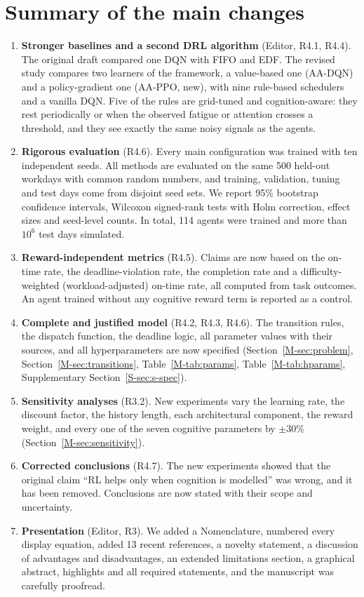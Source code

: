 \documentclass[11pt]{article}
\newcommand{\Sec}[1]{Section~\ref{M-#1}}
\newcommand{\Tab}[1]{Table~\ref{M-#1}}
\begin{document}
\section*{Summary of the main changes}
\begin{enumerate}[label=\arabic*.]
\item \textbf{Stronger baselines and a second DRL algorithm} (Editor, R4.1, R4.4). The original draft compared one DQN with FIFO and EDF. The revised study compares two learners of the framework, a value-based one (AA-DQN) and a policy-gradient one (AA-PPO, new), with nine rule-based schedulers and a vanilla DQN. Five of the rules are grid-tuned and cognition-aware: they rest periodically or when the observed fatigue or attention crosses a threshold, and they see exactly the same noisy signals as the agents.
\item \textbf{Rigorous evaluation} (R4.6). Every main configuration was trained with ten independent seeds. All methods are evaluated on the same 500 held-out workdays with common random numbers, and training, validation, tuning and test days come from disjoint seed sets. We report 95\% bootstrap confidence intervals, Wilcoxon signed-rank tests with Holm correction, effect sizes and seed-level counts. In total, 114 agents were trained and more than $10^6$ test days simulated.
\item \textbf{Reward-independent metrics} (R4.5). Claims are now based on the on-time rate, the deadline-violation rate, the completion rate and a difficulty-weighted (workload-adjusted) on-time rate, all computed from task outcomes. An agent trained without any cognitive reward term is reported as a control.
\item \textbf{Complete and justified model} (R4.2, R4.3, R4.6). The transition rules, the dispatch function, the deadline logic, all parameter values with their sources, and all hyperparameters are now specified (\Sec{sec:problem}, \Sec{sec:transitions}, \Tab{tab:params}, \Tab{tab:hparams}, Supplementary Section~\ref{S-sec:s-spec}).
\item \textbf{Sensitivity analyses} (R3.2). New experiments vary the learning rate, the discount factor, the history length, each architectural component, the reward weight, and every one of the seven cognitive parameters by $\pm30\%$ (\Sec{sec:sensitivity}).
\item \textbf{Corrected conclusions} (R4.7). The new experiments showed that the original claim ``RL helps only when cognition is modelled'' was wrong, and it has been removed. Conclusions are now stated with their scope and uncertainty.
\item \textbf{Presentation} (Editor, R3). We added a Nomenclature, numbered every display equation, added 13 recent references, a novelty statement, a discussion of advantages and disadvantages, an extended limitations section, a graphical abstract, highlights and all required statements, and the manuscript was carefully proofread.
\end{enumerate}
\end{document}
